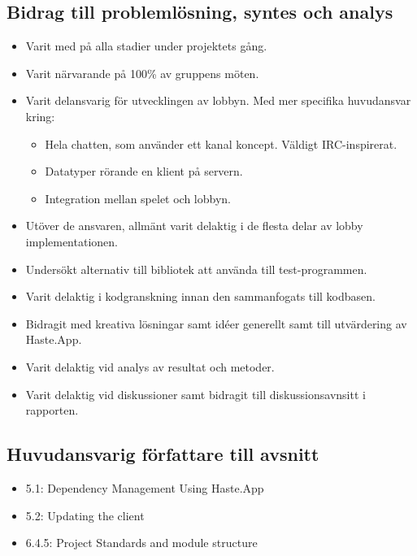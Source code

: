 \subsection{Bidrag till problemlösning, syntes och analys}
\begin{itemize}
  \item Varit med på alla stadier under projektets gång.
  \item Varit närvarande på 100\% av gruppens möten.

  \item Varit delansvarig för utvecklingen av lobbyn. Med mer specifika huvudansvar kring:
  \begin{itemize}
      \item Hela chatten, som använder ett kanal koncept. Väldigt IRC-inspirerat.
      \item Datatyper rörande en klient på servern.
      \item Integration mellan spelet och lobbyn. 
  \end{itemize}
  
  \item Utöver de ansvaren, allmänt varit delaktig i de flesta delar av lobby implementationen.

  \item Undersökt alternativ till bibliotek att använda till test-programmen.
  \item Varit delaktig i kodgranskning innan den sammanfogats till kodbasen.

  \item Bidragit med kreativa lösningar samt idéer generellt samt till utvärdering av Haste.App.
  \item Varit delaktig vid analys av resultat och metoder.
  \item Varit delaktig vid diskussioner samt bidragit till diskussionsavnsitt i rapporten.
\end{itemize}


\subsection{Huvudansvarig författare till avsnitt}
\begin{itemize}
  \item 5.1: Dependency Management Using Haste.App
  \item 5.2: Updating the client
  \item 6.4.5: Project Standards and module structure
\end{itemize}

